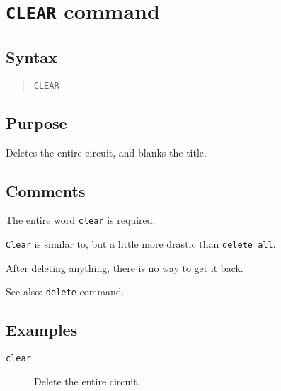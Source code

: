 \section{{\tt CLEAR} command}
\subsection{Syntax}
\begin{verse}
{\tt CLEAR}
\end{verse}
\subsection{Purpose}

Deletes the entire circuit, and blanks the title.
\subsection{Comments}

The entire word {\tt clear} is required.

{\tt Clear} is similar to, but a little more drastic than {\tt delete all}.

After deleting anything, there is no way to get it back.

See also: {\tt delete} command.
\subsection{Examples}

\begin{description}

\item[{\tt clear}] Delete the entire circuit.

\end{description}
